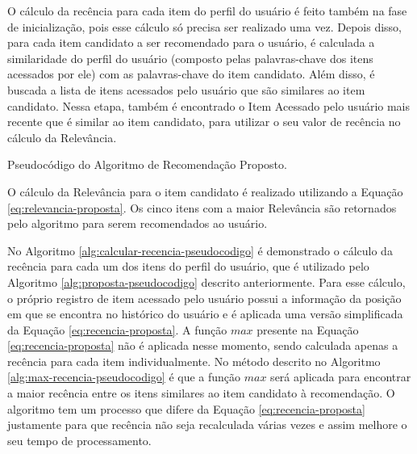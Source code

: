 O cálculo da recência para cada item do perfil do usuário é feito também na fase de inicialização, pois esse cálculo só
precisa ser realizado uma vez. Depois disso, para cada item candidato a ser recomendado para o usuário, é calculada a
similaridade do perfil do usuário (composto pelas palavras-chave dos itens acessados por ele) com as palavras-chave do item
candidato. Além disso, é buscada a lista de itens acessados pelo usuário que são similares ao item candidato. Nessa etapa, também é
encontrado o Item Acessado pelo usuário mais recente que é similar ao item candidato, para utilizar o seu valor de recência no cálculo da Relevância.

\begin{algorithm}
  \caption{Pseudocódigo do Algoritmo de Recomendação Proposto. \label{alg:proposta-pseudocodigo}}


\end{algorithm}

O cálculo da Relevância para o item candidato é realizado utilizando a Equação \ref{eq:relevancia-proposta}. Os cinco
itens com a maior Relevância são retornados pelo algoritmo para serem recomendados ao usuário.

No Algoritmo \ref{alg:calcular-recencia-pseudocodigo} é demonstrado o cálculo da recência para cada um dos itens do perfil do
usuário, que é utilizado pelo Algoritmo \ref{alg:proposta-pseudocodigo} descrito anteriormente. Para esse cálculo, o próprio registro
de item acessado pelo usuário possui a informação da posição em que se encontra no histórico do usuário e é aplicada
uma versão simplificada da Equação \ref{eq:recencia-proposta}. A função $max$ presente na Equação \ref{eq:recencia-proposta}
não é aplicada nesse momento, sendo calculada apenas a recência
para cada item individualmente. No método descrito no Algoritmo \ref{alg:max-recencia-pseudocodigo} é que a função $max$ será
aplicada para encontrar a maior recência entre os itens similares ao item candidato à recomendação. O algoritmo tem um processo
que difere da Equação \ref{eq:recencia-proposta} justamente para que recência não seja recalculada várias vezes e assim
melhore o seu tempo de processamento.

